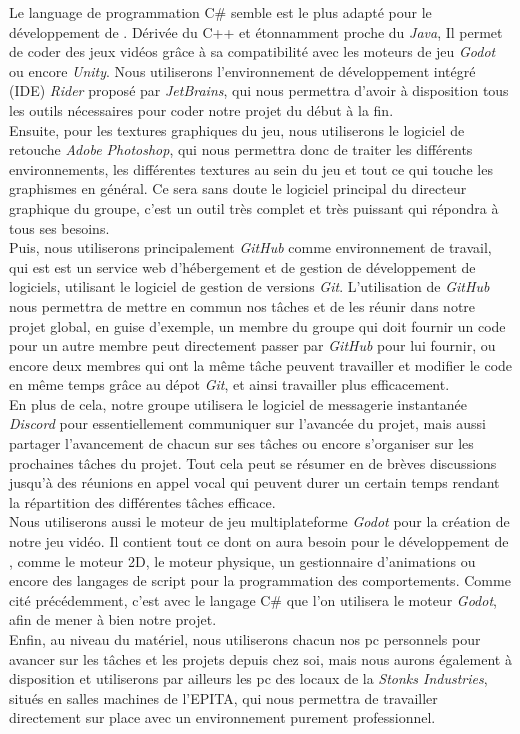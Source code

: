 Le language de programmation C\# semble est le plus adapté pour le développement de \textit{\gameName}. 
Dérivée du C++ et étonnamment proche du \textit{Java}, Il permet de coder des jeux vidéos grâce à sa compatibilité avec les moteurs de jeu \textit{Godot} ou encore \textit{Unity}.
Nous utiliserons l’environnement de développement intégré (IDE) \textit{Rider} proposé par \textit{JetBrains}, qui  nous permettra d’avoir à disposition tous les outils nécessaires pour coder notre projet du début à la fin.
\\

Ensuite, pour les textures graphiques du jeu, nous utiliserons le logiciel de retouche \textit{Adobe Photoshop}, qui nous permettra donc de traiter les différents environnements, les différentes textures au sein du jeu et tout ce qui touche les graphismes en général.
Ce sera sans doute le logiciel principal du directeur graphique du groupe, c'est un outil très complet et très puissant qui répondra à tous ses besoins.
\\

Puis, nous utiliserons principalement \textit{GitHub} comme environnement de travail, qui est est un service web d’hébergement et de gestion de développement de logiciels, utilisant le logiciel de gestion de versions \textit{Git}. 
L’utilisation de \textit{GitHub} nous permettra de mettre en commun nos tâches et de les réunir dans notre projet global, en guise d’exemple, un membre du groupe qui doit fournir un code pour un autre membre peut directement passer par \textit{GitHub} pour lui fournir, ou encore deux membres qui ont la même tâche peuvent travailler et modifier le code en même temps grâce au dépot \textit{Git}, et ainsi travailler plus efficacement.
\\

En plus de cela, notre groupe utilisera le logiciel de messagerie instantanée \textit{Discord} pour essentiellement communiquer sur l’avancée du projet, mais aussi partager l’avancement de chacun sur ses tâches ou encore s’organiser sur les prochaines tâches du projet. Tout cela peut se résumer en de brèves discussions jusqu’à des réunions en appel vocal qui peuvent durer un certain temps rendant la répartition des différentes tâches efficace.
\\

Nous utiliserons aussi le moteur de jeu multiplateforme \textit{Godot} pour la création de notre jeu vidéo.
Il contient tout ce dont on aura besoin pour le développement de \textit{\gameName}, comme le moteur 2D, le moteur physique, un gestionnaire d’animations ou encore des langages de script pour la programmation des comportements. 
Comme cité précédemment, c’est avec le langage C\# que l’on utilisera le moteur \textit{Godot}, afin de mener à bien notre projet.
\\

Enfin, au niveau du matériel, nous utiliserons chacun nos pc personnels pour avancer sur les tâches et les projets depuis chez soi, mais nous aurons également à disposition et utiliserons par ailleurs les pc des locaux de la \textit{Stonks Industries}, situés en salles machines de l’EPITA, qui nous permettra de travailler directement sur place avec un environnement purement professionnel.
\\
